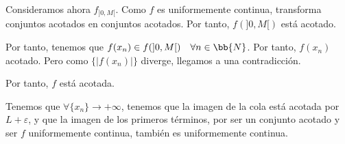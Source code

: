 \documentclass[12pt]{article}
\begin{document}
\begin{ejercicio} 
\begin{enumerate}
        Consideramos ahora $f_{]0,M[}$. Como $f$ es uniformemente continua, transforma conjuntos acotados en conjuntos acotados. Por tanto, $f(]0,M[)$ está acotado.

        Por tanto, tenemos que $f(x_n)\in f(]0,M[) \quad \forall n\in \bb{N}$. Por tanto, $f(x_n)$ acotado. Pero como $\{|f(x_n)|\}$ diverge, llegamos a una contradicción.

        Por tanto, $f$ está acotada.

        \begin{observacion}
            Tenemos que $\forall \{x_n\}\to +\infty$, tenemos que la imagen de la cola está acotada por $L+\varepsilon$, y que la imagen de los primeros términos, por ser un conjunto acotado y ser $f$ uniformemente continua, también es uniformemente continua.
        \end{observacion}
    \end{enumerate}
\end{ejercicio}
\end{document}
